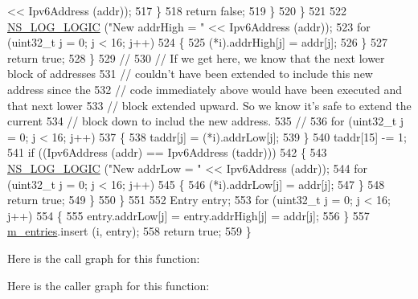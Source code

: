 \begin{DoxyCode}
      << Ipv6Address (addr));
517                     \}
518                   \textcolor{keywordflow}{return} \textcolor{keyword}{false};
519                 \}
520             \}
521 
522           \hyperlink{group__logging_ga88acd260151caf2db9c0fc84997f45ce}{NS\_LOG\_LOGIC} (\textcolor{stringliteral}{"New addrHigh = "} << Ipv6Address (addr));
523           \textcolor{keywordflow}{for} (uint32\_t j = 0; j < 16; j++)
524             \{
525               (*i).addrHigh[j] = addr[j];
526             \}
527           \textcolor{keywordflow}{return} \textcolor{keyword}{true};
528         \}
529       \textcolor{comment}{//}
530       \textcolor{comment}{// If we get here, we know that the next lower block of addresses}
531       \textcolor{comment}{// couldn't have been extended to include this new address since the}
532       \textcolor{comment}{// code immediately above would have been executed and that next lower}
533       \textcolor{comment}{// block extended upward.  So we know it's safe to extend the current}
534       \textcolor{comment}{// block down to includ the new address.}
535       \textcolor{comment}{//}
536       \textcolor{keywordflow}{for} (uint32\_t j = 0; j < 16; j++)
537         \{
538           taddr[j] = (*i).addrLow[j];
539         \}
540       taddr[15] -= 1;
541       \textcolor{keywordflow}{if} ((Ipv6Address (addr) == Ipv6Address (taddr)))
542         \{
543           \hyperlink{group__logging_ga88acd260151caf2db9c0fc84997f45ce}{NS\_LOG\_LOGIC} (\textcolor{stringliteral}{"New addrLow = "} << Ipv6Address (addr));
544           \textcolor{keywordflow}{for} (uint32\_t j = 0; j < 16; j++)
545             \{
546               (*i).addrLow[j] = addr[j];
547             \}
548           \textcolor{keywordflow}{return} \textcolor{keyword}{true};
549         \}
550     \}
551 
552   Entry entry;
553   \textcolor{keywordflow}{for} (uint32\_t j = 0; j < 16; j++)
554     \{
555       entry.addrLow[j] = entry.addrHigh[j] = addr[j];
556     \}
557   \hyperlink{classns3_1_1Ipv6AddressGeneratorImpl_ab7b8cc4871178edafc571d7a9449fef1}{m\_entries}.insert (i, entry);
558   \textcolor{keywordflow}{return} \textcolor{keyword}{true};
559 \}
\end{DoxyCode}


Here is the call graph for this function\+:




Here is the caller graph for this function\+:


